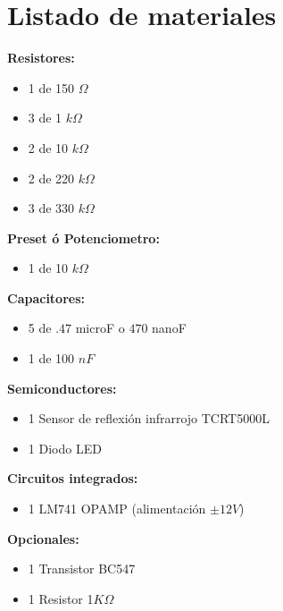 \documentclass[12pt]{article}
\begin{document}
    
    \section{Listado de materiales}
        
        \begin{multicols}{2}
        
            \textbf{Resistores:}
            \begin{itemize}
                \item 1 de 150 $\Omega$
                \item 3 de 1 $k\Omega$
                \item 2 de 10 $k\Omega$
                \item 2 de 220 $k\Omega$
                \item 3 de 330 $k\Omega$
            \end{itemize}
            
            \textbf{Preset ó Potenciometro:}
            \begin{itemize}
                \item 1 de 10 $k\Omega$
            \end{itemize}
            
            \textbf{Capacitores:}
            \begin{itemize}
                \item 5 de $.47$ microF o $470$ nanoF
                \item 1 de 100 $nF$
            \end{itemize}

      \columnbreak
    
          \textbf{Semiconductores:}
            \begin{itemize}
                \item 1 Sensor de reflexión infrarrojo TCRT5000L
                \item 1 Diodo LED
            \end{itemize}

        \textbf{Circuitos integrados:}
            \begin{itemize}
                \item 1 LM741 OPAMP  (alimentación $\pm12V$)
            \end{itemize}   
            
        \textbf{Opcionales:}
            \begin{itemize}
                \item 1 Transistor BC547
                \item 1 Resistor 1$K\Omega$
            \end{itemize}
      
      \end{multicols}
      
\end{document}
